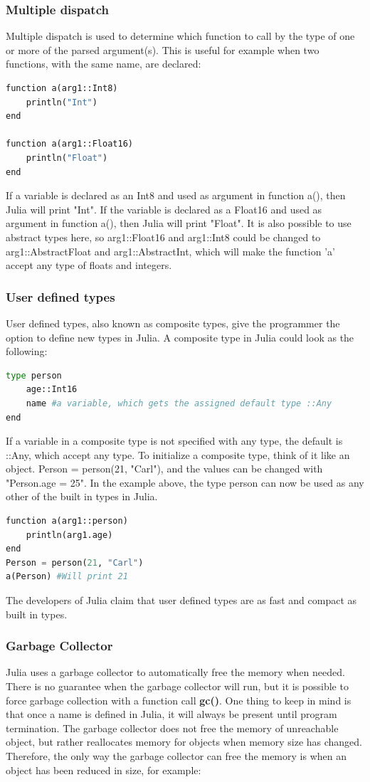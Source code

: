 \documentclass[a4paper, 11pt, titlepage]{article}
\begin{document}
\subsubsection{Multiple dispatch}
Multiple dispatch is used to determine which function to call by the type of one or more of the parsed argument(s). This is useful for example when two functions, with the same name, are declared:

\begin{lstlisting}[language=python]
function a(arg1::Int8)
	println("Int")  
end

function a(arg1::Float16)  
	println("Float")  
end    
\end{lstlisting}
If a variable is declared as an Int8 and used as argument in function a(), then Julia will print "Int". If the variable is declared as a Float16 and used as argument in function a(), then Julia will print "Float". It is also possible to use abstract types here, so arg1::Float16 and arg1::Int8 could be changed to arg1::AbstractFloat and arg1::AbstractInt, which will make the function 'a' accept any type of floats and integers.  
\subsubsection{User defined types}
User defined types, also known as composite types, give the programmer the option to define new types in Julia. A composite type in Julia could look as the following: 
\begin{lstlisting}[language=python]
type person 
	age::Int16 
	name #a variable, which gets the assigned default type ::Any
end    
\end{lstlisting}
If a variable in a composite type is not specified with any type, the default is ::Any, which accept any type. To initialize a composite type, think of it like an object. Person = person(21, "Carl"), and the values can be changed with "Person.age = 25".
In the example above, the type person can now be used as any other of the built in types in Julia.
\begin{lstlisting}[language=python]
function a(arg1::person)
	println(arg1.age)
end
Person = person(21, "Carl")
a(Person) #Will print 21
\end{lstlisting}
The developers of Julia claim that user defined types are as fast and compact as built in types. 

\subsubsection{Garbage Collector}
Julia uses a garbage collector to automatically free the memory when needed. There is no guarantee when the garbage collector will run, but it is possible to force garbage collection with a function call \textbf{gc()}. One thing to keep in mind is that once a name is defined in Julia, it will always be present until program termination. The garbage collector does not free the memory of unreachable object, but rather reallocates memory for objects when memory size has changed. Therefore, the only way the garbage collector can free the memory is when an object has been reduced in size, for example:
\end{document}
